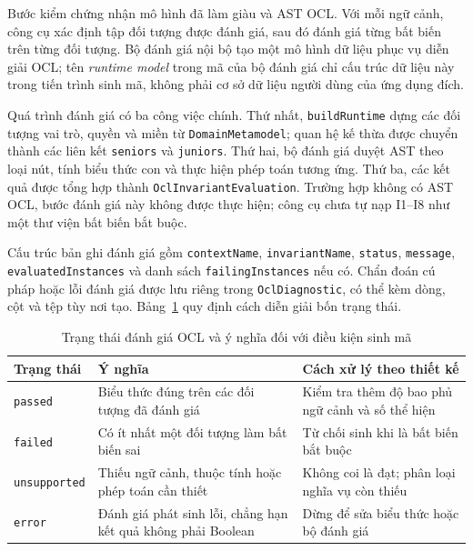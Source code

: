 Bước kiểm chứng nhận mô hình đã làm giàu và AST OCL. Với mỗi ngữ cảnh, công cụ xác định tập đối tượng được đánh giá, sau đó đánh giá từng bất biến trên từng đối tượng. Bộ đánh giá nội bộ tạo một mô hình dữ liệu phục vụ diễn giải OCL; tên \emph{runtime model} trong mã của bộ đánh giá chỉ cấu trúc dữ liệu này trong tiến trình sinh mã, không phải cơ sở dữ liệu người dùng của ứng dụng đích.

Quá trình đánh giá có ba công việc chính. Thứ nhất, \texttt{buildRuntime} dựng các đối tượng vai trò, quyền và miền từ \texttt{DomainMetamodel}; quan hệ kế thừa được chuyển thành các liên kết \texttt{seniors} và \texttt{juniors}. Thứ hai, bộ đánh giá duyệt AST theo loại nút, tính biểu thức con và thực hiện phép toán tương ứng. Thứ ba, các kết quả được tổng hợp thành \texttt{OclInvariantEvaluation}. Trường hợp không có AST OCL, bước đánh giá này không được thực hiện; công cụ chưa tự nạp I1--I8 như một thư viện bất biến bắt buộc.

Cấu trúc bản ghi đánh giá gồm \texttt{contextName}, \texttt{invariantName}, \texttt{status}, \texttt{message}, \texttt{evaluatedInstances} và danh sách \texttt{failingInstances} nếu có. Chẩn đoán cú pháp hoặc lỗi đánh giá được lưu riêng trong \texttt{OclDiagnostic}, có thể kèm dòng, cột và tệp tùy nơi tạo. Bảng~\ref{tab:trang-thai-ocl-c3} quy định cách diễn giải bốn trạng thái.

\begin{table}[htbp]
\centering
\caption{Trạng thái đánh giá OCL và ý nghĩa đối với điều kiện sinh mã}
\label{tab:trang-thai-ocl-c3}
\small
\begin{tabularx}{\textwidth}{@{}lXX@{}}
\toprule
\textbf{Trạng thái} & \textbf{Ý nghĩa} & \textbf{Cách xử lý theo thiết kế} \\
\midrule
\texttt{passed} & Biểu thức đúng trên các đối tượng đã đánh giá & Kiểm tra thêm độ bao phủ ngữ cảnh và số thể hiện \\
\texttt{failed} & Có ít nhất một đối tượng làm bất biến sai & Từ chối sinh khi là bất biến bắt buộc \\
\texttt{unsupported} & Thiếu ngữ cảnh, thuộc tính hoặc phép toán cần thiết & Không coi là đạt; phân loại nghĩa vụ còn thiếu \\
\texttt{error} & Đánh giá phát sinh lỗi, chẳng hạn kết quả không phải Boolean & Dừng để sửa biểu thức hoặc bộ đánh giá \\
\bottomrule
\end{tabularx}
\end{table}

